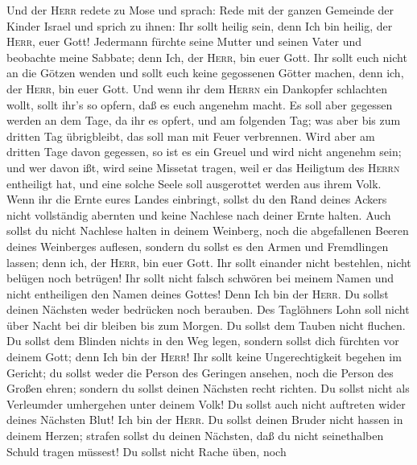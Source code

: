  Und der \textsc{Herr} redete zu Mose und sprach:
 Rede mit der ganzen Gemeinde der Kinder Israel und sprich
zu ihnen: Ihr sollt heilig sein, denn Ich bin heilig, der \textsc{Herr},
euer Gott!  Jedermann fürchte seine Mutter und seinen
Vater und beobachte meine Sabbate; denn Ich, der \textsc{Herr}, bin euer
Gott.  Ihr sollt euch nicht an die Götzen wenden und sollt
euch keine gegossenen Götter machen, denn ich, der \textsc{Herr}, bin
euer Gott.  Und wenn ihr dem \textsc{Herrn} ein Dankopfer
schlachten wollt, sollt ihr's so opfern, daß es euch angenehm macht.
 Es soll aber gegessen werden an dem Tage, da ihr es
opfert, und am folgenden Tag; was aber bis zum dritten Tag übrigbleibt,
das soll man mit Feuer verbrennen.  Wird aber am dritten
Tage davon gegessen, so ist es ein Greuel und wird nicht angenehm sein;
 und wer davon ißt, wird seine Missetat tragen, weil er
das Heiligtum des \textsc{Herrn} entheiligt hat, und eine solche Seele
soll ausgerottet werden aus ihrem Volk.  Wenn ihr die
Ernte eures Landes einbringt, sollst du den Rand deines Ackers nicht
vollständig abernten und keine Nachlese nach deiner Ernte halten.
 Auch sollst du nicht Nachlese halten in deinem Weinberg,
noch die abgefallenen Beeren deines Weinberges auflesen, sondern du
sollst es den Armen und Fremdlingen lassen; denn ich, der \textsc{Herr},
bin euer Gott.  Ihr sollt einander nicht bestehlen, nicht
belügen noch betrügen!  Ihr sollt nicht falsch schwören
bei meinem Namen und nicht entheiligen den Namen deines Gottes! Denn Ich
bin der \textsc{Herr}.  Du sollst deinen Nächsten weder
bedrücken noch berauben. Des Taglöhners Lohn soll nicht über Nacht bei
dir bleiben bis zum Morgen.  Du sollst dem Tauben nicht
fluchen. Du sollst dem Blinden nichts in den Weg legen, sondern sollst
dich fürchten vor deinem Gott; denn Ich bin der \textsc{Herr}!
 Ihr sollt keine Ungerechtigkeit begehen im Gericht; du
sollst weder die Person des Geringen ansehen, noch die Person des Großen
ehren; sondern du sollst deinen Nächsten recht richten. 
Du sollst nicht als Verleumder umhergehen unter deinem Volk! Du sollst
auch nicht auftreten wider deines Nächsten Blut!  Ich bin
der \textsc{Herr}. Du sollst deinen Bruder nicht hassen in deinem
Herzen; strafen sollst du deinen Nächsten, daß du nicht seinethalben
Schuld tragen müssest!  Du sollst nicht Rache üben, noch
